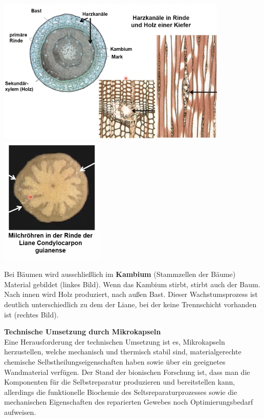 \begin{center}
    \includegraphics[width=11cm]{lec5/figures/baum.png}
    \includegraphics[width=5cm]{lec5/figures/liane.png}
\end{center}
Bei Bäumen wird ausschließlich im \textbf{Kambium} (Stammzellen der Bäume) Material gebildet (linkes Bild). Wenn das Kambium stirbt, stirbt auch der Baum. Nach innen wird Holz produziert, nach außen Bast. Dieser Wachstumsprozess ist deutlich unterschiedlich zu dem der Liane, bei der keine Trennschicht vorhanden ist (rechtes Bild).\\

\vspace*{2\baselineskip}

\textbf{Technische Umsetzung durch Mikrokapseln}\\

Eine Herausforderung der technischen Umsetzung ist es, Mikrokapseln herzustellen, welche mechanisch und thermisch stabil sind, materialgerechte chemische Selbstheilungseigenschaften haben sowie über ein geeignetes Wandmaterial verfügen. Der Stand der bionischen Forschung ist, dass man die Komponenten für die Selbstreparatur produzieren und bereitstellen kann, allerdings die funktionelle Biochemie des Seltsreparaturprozesses sowie die mechanischen Eigenschaften des reparierten Gewebes noch Optimierungsbedarf aufweisen.

